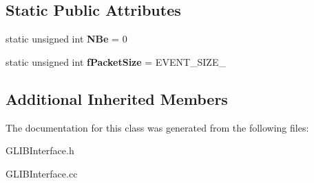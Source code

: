 \subsection*{Static Public Attributes}
\begin{DoxyCompactItemize}
\item 
\hypertarget{class_ph2___hw_interface_1_1_g_l_i_b_interface_a85f9c804b41b8eb7b4d81f7307b5bc4a}{static unsigned int {\bfseries N\-Be} = 0}\label{class_ph2___hw_interface_1_1_g_l_i_b_interface_a85f9c804b41b8eb7b4d81f7307b5bc4a}

\item 
\hypertarget{class_ph2___hw_interface_1_1_g_l_i_b_interface_a7e34fbc5d0399cb77d070c8062e104f9}{static unsigned int {\bfseries f\-Packet\-Size} = E\-V\-E\-N\-T\-\_\-\-S\-I\-Z\-E\-\_}\label{class_ph2___hw_interface_1_1_g_l_i_b_interface_a7e34fbc5d0399cb77d070c8062e104f9}

\end{DoxyCompactItemize}
\subsection*{Additional Inherited Members}


The documentation for this class was generated from the following files\-:\begin{DoxyCompactItemize}
\item 
G\-L\-I\-B\-Interface.\-h\item 
G\-L\-I\-B\-Interface.\-cc\end{DoxyCompactItemize}
